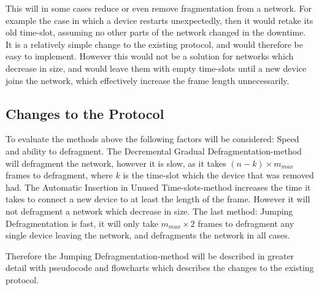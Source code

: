
\bigskip

This will in some cases reduce or even remove fragmentation from a network. 
For example the case in which a device restarts unexpectedly, then it would retake its old time-slot, assuming no other parts of the network changed in the downtime.
It is a relatively simple change to the existing protocol, and would therefore be easy to implement.  
However this would not be a solution for networks which decrease in size, and would leave them with empty time-slots until a new device joins the network, which effectively increase the frame length unnecessarily.

\subsection{Changes to the Protocol}
To evaluate the methods above the following factors will be considered: Speed and ability to defragment.
The Decremental Gradual Defragmentation-method will defragment the network, however it is slow, as it takes $(n - k) \times m_{max}$ frames to defragment, where $k$ is the time-slot which the device  that was removed had. 
The Automatic Insertion in Unused Time-slots-method increases the time it takes to connect a new device to at least the length of the frame. 
However it will not defragment a network which decrease in size. 
The last method: Jumping Defragmentation is fast, it will only take $m_{max} \times 2$ frames to defragment any single device leaving the network, and defragments the network in all cases. 

Therefore the Jumping Defragmentation-method will be described in greater detail with pseudocode and flowcharts which describes the changes to the existing protocol. 

